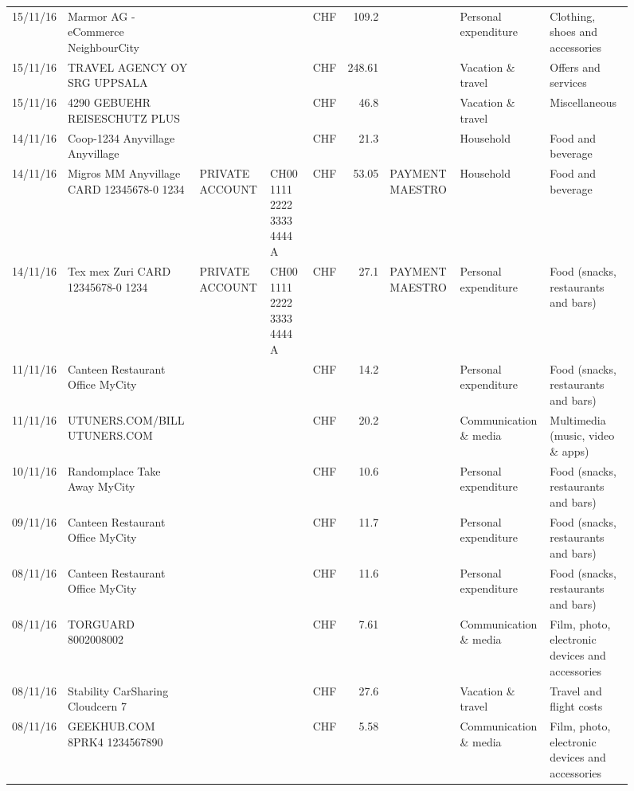 \begin{landscape}
\begin{sidewaysfigure}
\begin{table}[h]
\begin{center}
\begin{tabular}{rllllrlll}
		15/11/16 & Marmor AG - eCommerce     NeighbourCity &       &       & CHF   & 109.2 &       & Personal expenditure & Clothing, shoes and accessories \\
		15/11/16 & TRAVEL AGENCY OY SRG     UPPSALA &       &       & CHF   & 248.61 &       & Vacation \& travel & Offers and services \\
		15/11/16 & 4290 GEBUEHR REISESCHUTZ PLUS &       &       & CHF   & 46.8  &       & Vacation \& travel & Miscellaneous \\
		14/11/16 & Coop-1234 Anyvillage    Anyvillage &       &       & CHF   & 21.3  &       & Household & Food and beverage \\
		14/11/16 & Migros MM Anyvillage CARD 12345678-0 1234 & PRIVATE ACCOUNT & CH00 1111 2222 3333 4444 A & CHF   & 53.05 & PAYMENT MAESTRO & Household & Food and beverage \\
		14/11/16 & Tex mex Zuri CARD 12345678-0 1234 & PRIVATE ACCOUNT & CH00 1111 2222 3333 4444 A & CHF   & 27.1  & PAYMENT MAESTRO & Personal expenditure & Food (snacks, restaurants and bars) \\
		11/11/16 & Canteen Restaurant Office      MyCity &       &       & CHF   & 14.2  &       & Personal expenditure & Food (snacks, restaurants and bars) \\
		11/11/16 & UTUNERS.COM/BILL          UTUNERS.COM &       &       & CHF   & 20.2  &       & Communication \& media & Multimedia (music, video \& apps) \\
		10/11/16 & Randomplace Take Away     MyCity &       &       & CHF   & 10.6  &       & Personal expenditure & Food (snacks, restaurants and bars) \\
		09/11/16 & Canteen Restaurant Office      MyCity &       &       & CHF   & 11.7  &       & Personal expenditure & Food (snacks, restaurants and bars) \\
		08/11/16 & Canteen Restaurant Office      MyCity &       &       & CHF   & 11.6  &       & Personal expenditure & Food (snacks, restaurants and bars) \\
		08/11/16 & TORGUARD                 8002008002 &       &       & CHF   & 7.61  &       & Communication \& media & Film, photo, electronic devices and accessories \\
		08/11/16 & Stability CarSharing      Cloudcern 7 &       &       & CHF   & 27.6  &       & Vacation \& travel & Travel and flight costs \\
		08/11/16 & GEEKHUB.COM  8PRK4        1234567890 &       &       & CHF   & 5.58  &       & Communication \& media & Film, photo, electronic devices and accessories \\

\end{tabular}
\end{center}
\end{table}
\end{sidewaysfigure}
\end{landscape}
